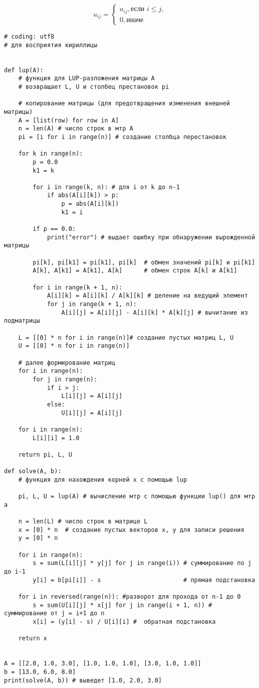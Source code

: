 \[
    u_{ij} = \left\{\begin{array}{l}
                        a_{ij}, \text{если } i \leq j,\\
                        0, \text{иначе }
                    \end{array}\right.
\]

\begin{lstlisting}
# coding: utf8
# для восприятия кириллицы


def lup(A):
    # функция для LUP-разложения матрицы A
    # возвращает L, U и столбец престановок pi

    # копирование матрицы (для предотвращения изменения внешней матрицы)
    A = [list(row) for row in A]
    n = len(A) # число строк в мтр A
    pi = [i for i in range(n)] # создание столбца перестановок

    for k in range(n):
        p = 0.0
        k1 = k

        for i in range(k, n): # для i от k до n-1
            if abs(A[i][k]) > p:
                p = abs(A[i][k])
                k1 = i

        if p == 0.0:
            print("error") # выдает ошибку при обнаружении вырожденной матрицы

        pi[k], pi[k1] = pi[k1], pi[k]  # обмен значений pi[k] и pi[k1]
        A[k], A[k1] = A[k1], A[k]      # обмен строк A[k] и A[k1]

        for i in range(k + 1, n):
            A[i][k] = A[i][k] / A[k][k] # деление на ведущий элемент
            for j in range(k + 1, n):
                A[i][j] = A[i][j] - A[i][k] * A[k][j] # вычитание из подматрицы

    L = [[0] * n for i in range(n)]# создание пустых матриц L, U
    U = [[0] * n for i in range(n)]

    # далее формирование матриц
    for i in range(n):
        for j in range(n):
            if i > j:
                L[i][j] = A[i][j]
            else:
                U[i][j] = A[i][j]

    for i in range(n):
        L[i][i] = 1.0

    return pi, L, U

def solve(A, b):
    # функция для нахождения корней х с помощью lup

    pi, L, U = lup(A) # вычисление мтр с помощью функции lup() для мтр а

    n = len(L) # число строк в матрице L
    x = [0] * n  # создание пустых векторов x, y для записи решения
    y = [0] * n

    for i in range(n):
        s = sum(L[i][j] * y[j] for j in range(i)) # суммирование по j до i-1
        y[i] = b[pi[i]] - s                       # прямая подстановка

    for i in reversed(range(n)): #разворот для прохода от n-1 до 0
        s = sum(U[i][j] * x[j] for j in range(i + 1, n)) # суммирование от j = i+1 до n
        x[i] = (y[i] - s) / U[i][i] #  обратная подстановка

    return x


A = [[2.0, 1.0, 3.0], [1.0, 1.0, 1.0], [3.0, 1.0, 1.0]]
b = [13.0, 6.0, 8.0]
print(solve(A, b)) # выведет [1.0, 2.0, 3.0]
\end{lstlisting}
